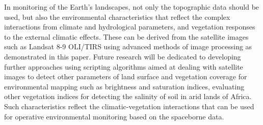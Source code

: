 \documentclass[jimaging,article,submit,pdftex,moreauthors]{Definitions/mdpi}
\begin{document}
In monitoring of the Earth's landscapes, not only the topographic data should be used, but also the environmental characteristics that reflect the complex interactions from climate and hydrological parameters, and vegetation responses to the external climatic effects. These can be derived from the satellite images such as Landsat 8-9 OLI/TIRS using advanced methods of image processing as demonstrated in this paper. Future research will be dedicated to developing further approaches using scripting algorithms aimed at dealing with satellite images to detect other parameters of land surface and vegetation coverage for environmental mapping such as brightness and saturation indices,  evaluating other vegetation indices for detecting the salinity of soil in arid lands of Africa. Such characteristics reflect the climatic-vegetation interactions that can be used for operative environmental monitoring based on the spaceborne data.  







\end{document}
